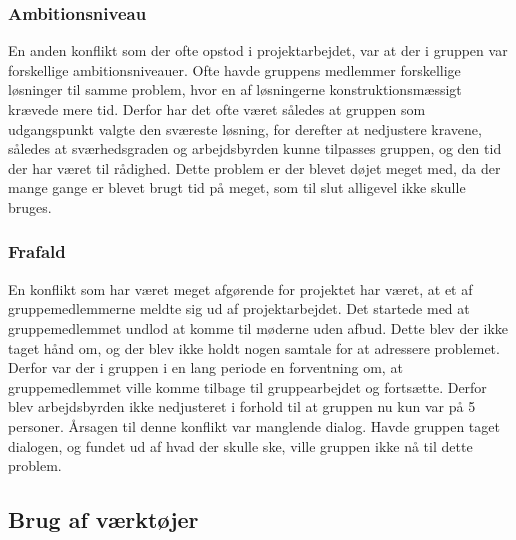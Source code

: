 \subsubsection{Ambitionsniveau}
En anden konflikt som der ofte opstod i projektarbejdet, var at der i gruppen var forskellige ambitionsniveauer. Ofte havde gruppens medlemmer forskellige 
løsninger til samme problem, hvor en af løsningerne konstruktionsmæssigt krævede mere tid. Derfor har det ofte været således at gruppen som udgangspunkt 
valgte den sværeste løsning, for derefter at nedjustere kravene, således at sværhedsgraden og arbejdsbyrden kunne tilpasses gruppen, og den tid der har været 
til rådighed. Dette problem er der blevet døjet meget med, da der mange gange er blevet brugt tid på meget, som til slut alligevel ikke skulle bruges. 
\subsubsection{Frafald}
En konflikt som har været meget afgørende for projektet har været, at et af gruppemedlemmerne meldte sig ud af projektarbejdet. Det startede med at 
gruppemedlemmet undlod at komme til møderne uden afbud. Dette blev der ikke taget hånd om, og der blev ikke holdt nogen samtale for at adressere problemet. 
Derfor var der i gruppen i en lang periode en forventning om, at gruppemedlemmet ville komme tilbage til gruppearbejdet og fortsætte. Derfor blev 
arbejdsbyrden ikke nedjusteret i forhold til at gruppen nu kun var på 5 personer. Årsagen til denne konflikt var manglende dialog. Havde gruppen taget 
dialogen, og fundet ud af hvad der skulle ske, ville gruppen ikke nå til dette problem.

\subsection{Brug af værktøjer}
